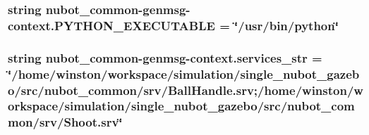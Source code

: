 \hypertarget{namespacenubot__common-genmsg-context_a07f30a33447f3b83a20605f1732e2763}{
\subsubsection[{P\-Y\-T\-H\-O\-N\-\_\-\-E\-X\-E\-C\-U\-T\-A\-B\-L\-E}]{\setlength{\rightskip}{0pt plus 5cm}string nubot\-\_\-common-\/genmsg-\/context.\-P\-Y\-T\-H\-O\-N\-\_\-\-E\-X\-E\-C\-U\-T\-A\-B\-L\-E = \char`\"{}/usr/bin/python\char`\"{}}}\label{namespacenubot__common-genmsg-context_a07f30a33447f3b83a20605f1732e2763}
\hypertarget{namespacenubot__common-genmsg-context_a1e2a824c1778c805a4593863a72ba35e}{
\subsubsection[{services\-\_\-str}]{\setlength{\rightskip}{0pt plus 5cm}string nubot\-\_\-common-\/genmsg-\/context.\-services\-\_\-str = \char`\"{}/home/winston/workspace/simulation/single\-\_\-nubot\-\_\-gazebo/src/nubot\-\_\-common/srv/Ball\-Handle.\-srv;/home/winston/workspace/simulation/single\-\_\-nubot\-\_\-gazebo/src/nubot\-\_\-common/srv/Shoot.\-srv\char`\"{}}}\label{namespacenubot__common-genmsg-context_a1e2a824c1778c805a4593863a72ba35e}

